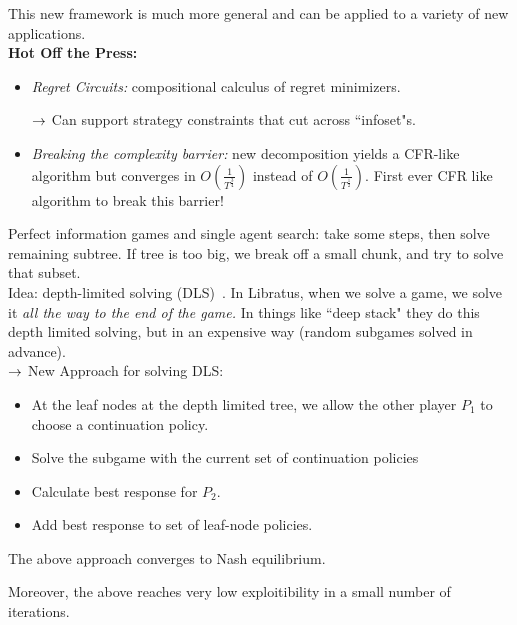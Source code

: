 This new framework is much more general and can be applied to a variety of new applications. \\

{\bf Hot Off the Press:}
\begin{itemize}
    \item {\it Regret Circuits:} compositional calculus of regret minimizers.
    
    $\rightarrow$ Can support strategy constraints that cut across ``infoset"s.
    
    \item {\it Breaking the complexity barrier:} new decomposition yields a CFR-like algorithm but converges in $O\left(\frac{1}{T^{\frac{3}{4}}}\right)$ instead of $O\left(\frac{1}{T^{\frac{1}{2}}}\right)$. First ever CFR like algorithm to break this barrier!
\end{itemize}

Perfect information games and single agent search: take some steps, then solve remaining subtree. If tree is too big, we break off a small chunk, and try to solve that subset. \\

Idea: depth-limited solving (DLS)~\cite{brown2018depth}. In Libratus, when we solve a game, we solve it {\it all the way to the end of the game.} In things like ``deep stack" they do this depth limited solving, but in an expensive way (random subgames solved in advance). \\

$\rightarrow$ New Approach for solving DLS:
\begin{itemize}
    \item At the leaf nodes at the depth limited tree, we allow the other player $P_1$ to choose a continuation policy.
    \item Solve the subgame with the current set of continuation policies
    \item Calculate best response for $P_2$.
    \item Add best response to set of leaf-node policies.
\end{itemize}

\begin{theorem}
The above approach converges to Nash equilibrium.
\end{theorem}

Moreover, the above reaches very low exploitibility in a small number of iterations. \\

